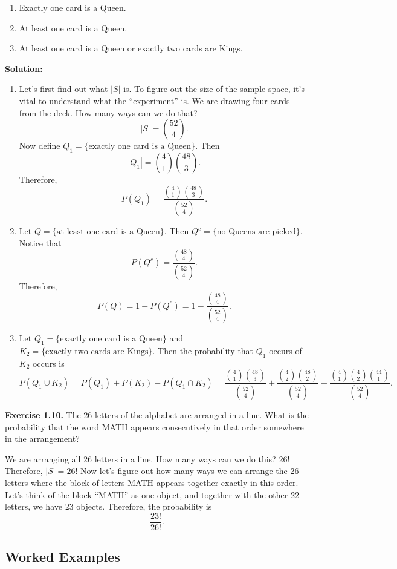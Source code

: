 \documentclass[
  12pt,
]{krantzNoCorner}
\providecommand{\tightlist}{%
  \setlength{\itemsep}{0pt}\setlength{\parskip}{0pt}}
\begin{document}
\begin{enumerate}
\def\labelenumi{\arabic{enumi}.}
\item
  Exactly one card is a Queen.
\item
  At least one card is a Queen.
\item
  At least one card is a Queen or exactly two cards are Kings.
\end{enumerate}

\textbf{Solution:}

\begin{enumerate}
\def\labelenumi{\arabic{enumi}.}
\tightlist
\item
  Let's first find out what \(|S|\) is. To figure out the size of the
  sample space, it's vital to understand what the ``experiment'' is. We
  are drawing four cards from the deck. How many ways can we do that?
  \[|S|=\binom{52}{4}.\] Now define
  \(Q_1 = \{\text{exactly one card is a Queen}\}\). Then
  \[|Q_1|=\binom{4}{1}\binom{48}{3}.\] Therefore,
  \[P(Q_1)=\frac{\binom{4}{1}\binom{48}{3}}{\binom{52}{4}}.\]
\item
  Let \(Q=\{\text{at least one card is a Queen}\}.\) Then
  \(Q^c=\{\text{no Queens are picked}\}.\) Notice that
  \[P(Q^c)=\frac{\binom{48}{4}}{\binom{52}{4}}.\]
  Therefore,\[P(Q)=1-P(Q^c)=1-\frac{\binom{48}{4}}{\binom{52}{4}}.\]
\item
  Let \(Q_1 = \{\text{exactly one card is a Queen}\}\) and
  \(K_2 = \{\text{exactly two cards are Kings}\}.\) Then the probability
  that \(Q_1\) occurs of \(K_2\) occurs is
  \[P(Q_1\cup K_2)=P(Q_1)+P(K_2)-P(Q_1\cap K_2)=\frac{\binom{4}{1}\binom{48}{3}}{\binom{52}{4}}+\frac{\binom{4}{2}\binom{48}{2}}{\binom{52}{4}}-\frac{\binom{4}{1}\binom{4}{2}\binom{44}{1}}{\binom{52}{4}}.\]
\end{enumerate}

\textbf{Exercise 1.10.} The 26 letters of the alphabet are arranged in a
line. What is the probability that the word MATH appears consecutively
in that order somewhere in the arrangement?

We are arranging all 26 letters in a line. How many ways can we do this?
26! Therefore, \(|S|=26!\) Now let's figure out how many ways we can
arrange the 26 letters where the block of letters MATH appears together
exactly in this order. Let's think of the block ``MATH'' as one object,
and together with the other 22 letters, we have 23 objects. Therefore,
the probability is \[\frac{23!}{26!}.\]

\hypertarget{worked-examples-1}{%
\subsection{Worked Examples}\label{worked-examples-1}}
\end{document}
